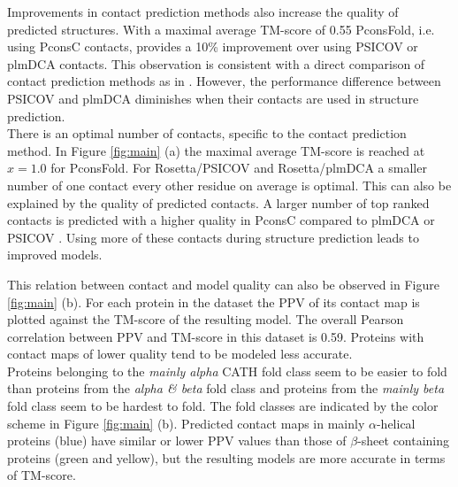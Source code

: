 \documentclass{bioinfo}
\begin{document}
Improvements in contact prediction methods also increase the quality of predicted structures. With a maximal average TM-score of 0.55 PconsFold, i.e. using PconsC contacts, provides a 10\% improvement over using PSICOV or plmDCA contacts. This observation is consistent with a direct comparison of contact prediction methods as in \citeauthor{skwark_PconsC:_2013} \citeyear{skwark_PconsC:_2013}. However, the performance difference between PSICOV and plmDCA diminishes when their contacts are used in structure prediction. \\\indent
There is an optimal number of contacts, specific to the contact prediction method. In Figure \ref{fig:main} (a) the maximal average TM-score is reached at $x=1.0$ for PconsFold. For Rosetta/PSICOV and Rosetta/plmDCA a smaller number of one contact every other residue on average is optimal. This can also be explained by the quality of predicted contacts. A larger number of top ranked contacts is predicted with a higher quality in PconsC compared to plmDCA or PSICOV \cite[]{skwark_PconsC:_2013}. Using more of these contacts during structure prediction leads to improved models. \\\indent

This relation between contact and model quality can also be observed
in Figure \ref{fig:main} (b). For each protein in the dataset the PPV
of its contact map is plotted against the TM-score of the resulting
model. The overall Pearson correlation between PPV and TM-score in
this dataset is 0.59. Proteins with contact maps of lower quality tend
to be modeled less accurate. \\\indent Proteins belonging to the {\it
  mainly alpha} CATH fold class seem to be easier to fold than
proteins from the {\it alpha \& beta} fold class and proteins from the
{\it mainly beta} fold class seem to be hardest to fold. The fold
classes are indicated by the color scheme in Figure \ref{fig:main}
(b). Predicted contact maps in mainly $\alpha$-helical proteins (blue)
have similar or lower PPV values than those of $\beta$-sheet
containing proteins (green and yellow), but the resulting models are
more accurate in terms of TM-score.
\end{document}
